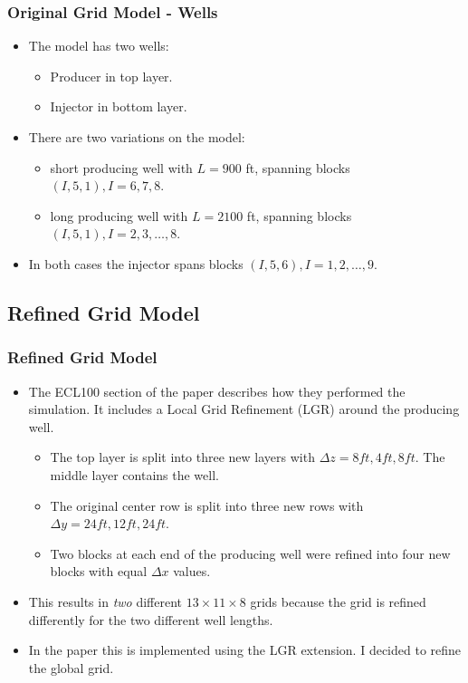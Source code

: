 \begin{frame}
    \frametitle{Original Grid Model - Wells}
    \begin{itemize}
        \item The model has two wells:
            \begin{itemize}
                \item Producer in top layer.
                \item Injector in bottom layer. 
            \end{itemize}
        \pause
        \item There are two variations on the model:
        \begin{itemize}
             \item short producing well with $L=900$ ft, spanning blocks $(I,5,1), I=6,7,8$.
             \item long producing well with $L=2100$ ft, spanning blocks $(I,5,1), I=2,3,\dots,8$.
        \end{itemize}
        \item In both cases the injector spans blocks $(I,5,6),I=1,2,\dots,9$.
    \end{itemize}
\end{frame}


\subsection{Refined Grid Model}
\begin{frame}
    \frametitle{Refined Grid Model}
    \begin{itemize}
        \item The ECL100 section of the paper describes how they performed the simulation. It includes a Local Grid Refinement (LGR) around the producing well.
        \pause
        \begin{itemize}
            \item The top layer is split into three new layers with $\Delta z = 8ft, 4ft, 8ft$. The middle layer contains the well.
            \pause
            \item The original center row is split into three new rows with $\Delta y = 24ft, 12ft, 24ft$.
            \pause
            \item Two blocks at each end of the producing well were refined into four new blocks with equal $\Delta x$ values.
            \pause
        \end{itemize}
        \item This results in \emph{two} different $13 \times 11 \times 8$ grids because the grid is refined differently for the two different well lengths.
        \pause
        \item In the paper this is implemented using the LGR extension. I decided to refine the global grid.
    \end{itemize}
\end{frame}


